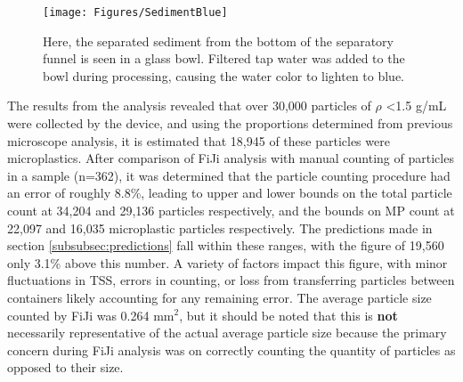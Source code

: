 \documentclass[fleqn,10pt]{SelfArx} %
\begin{document}
	\begin{figure}[h]
		\centering
		\texttt{[image: Figures/SedimentBlue]}
		\caption[Separated Sediment]{Here, the separated sediment from the bottom of the separatory funnel is seen in a glass bowl. Filtered tap water was added to the bowl during processing, causing the water color to lighten to blue.}
		\label{fig:SedBlue}
	\end{figure}
	The results from the analysis revealed that over 30,000 particles of $\rho$ \textless 1.5 g/mL were collected by the device, and using the proportions determined from previous microscope analysis, it is estimated that 18,945 of these particles were microplastics. After comparison of FiJi analysis with manual counting of particles in a sample (n=362), it was determined that the particle counting procedure had an error of roughly 8.8\%, leading to upper and lower bounds on the total particle count at 34,204 and 29,136 particles respectively, and the bounds on MP count at 22,097 and 16,035 microplastic particles respectively. The predictions made in section \ref{subsubsec:predictions} fall within these ranges, with the figure of 19,560 only 3.1\% above this number. A variety of factors impact this figure, with minor fluctuations in TSS, errors in counting, or loss from transferring particles between containers likely accounting for any remaining error. The average particle size counted by FiJi was 0.264 mm$^2$, but it should be noted that this is \textbf{not} necessarily representative of the actual average particle size because the primary concern during FiJi analysis was on correctly counting the quantity of particles as opposed to their size. 
\end{document}
